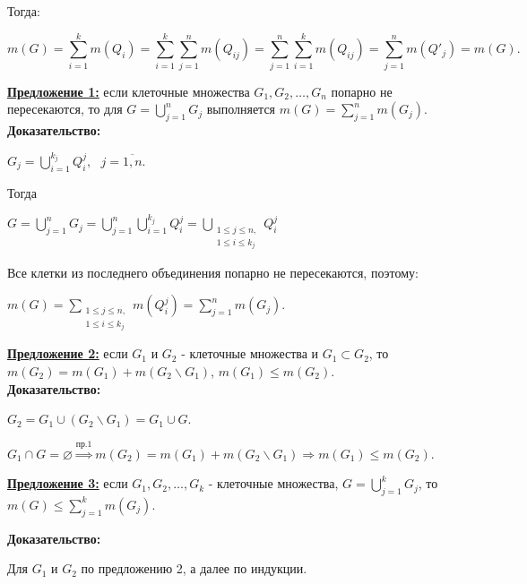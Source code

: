 \documentclass[a4paper,12pt]{article} %
\begin{document}
Тогда:

\begin{equation*}
	m(G) =  \sum\limits_{i = 1}^{k} m(Q_i) = \sum\limits_{i = 1}^{k} \sum\limits_{j = 1}^{n} m(Q_{ij}) = \sum\limits_{j = 1}^{n} \sum\limits_{i = 1}^{k} m(Q_{ij}) = \sum\limits_{j = 1}^{n} m(Q'_j) = m(G).
\end{equation*}

\underline{\textbf{Предложение 1:}} если клеточные множества $G_1, G_2, \ldots, G_n$ попарно не пересекаются, то для $G = \bigcup\limits_{j = 1}^n G_j$ выполняется $m(G) = \sum\limits_{j = 1}^n m(G_j)$.\\

\textbf{Доказательство:}

$G_j = \bigcup\limits_{i = 1}^{k_j} Q_i^j, \text{ } j = \overline{1, n}.$

Тогда

$G = \bigcup\limits_{j = 1}^n G_j = \bigcup\limits_{j = 1}^n \bigcup\limits_{i = 1}^{k_j} Q_i^j = \bigcup\limits_{\substack{1 \leqslant j \leqslant n,\\ 1\leqslant i \leqslant k_j}} Q_i^j$

Все клетки из последнего объединения попарно не пересекаются, поэтому:

$m(G) = \sum\limits_{\substack{1 \leqslant j \leqslant n,\\ 1\leqslant i \leqslant k_j}} m(Q_i^j) = \sum\limits_{j = 1}^n m(G_j)$.

\vspace{5mm}

\underline{\textbf{Предложение 2:}} если $G_1$ и $G_2$ - клеточные множества и $G_1 \subset G_2$, то $m(G_2) = m(G_1) + m(G_2 \backslash G_1)$,  $m(G_1) \leqslant m(G_2)$.\\

\textbf{Доказательство:}

$G_2 = G_1 \cup (G_2 \backslash G_1) = G_1 \cup G$.

$G_1 \cap G = \varnothing \stackrel{\text{пр.1}}{\Longrightarrow} m(G_2) = m(G_1) + m(G_2 \backslash G_1) \Rightarrow m(G_1) \leqslant m(G_2)$.

\underline{\textbf{Предложение 3:}} если $G_1, G_2, \ldots, G_k$ - клеточные множества, $G = \bigcup\limits_{j = 1}^k G_j$, то $m(G) \leqslant \sum\limits_{j = 1}^k m(G_j)$.

\textbf{Доказательство:}

Для $G_1$ и $G_2$ по предложению 2, а далее по индукции.

\vspace{3mm}
\end{document}
